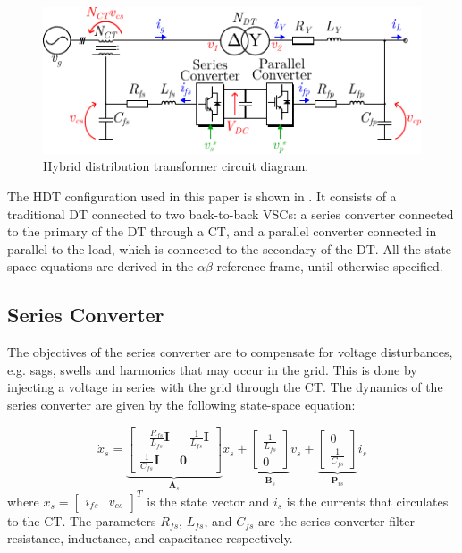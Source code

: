 \begin{figure}[t!]
    \centering
    \includegraphics[width=\columnwidth]{Images/HDT_Diagram.pdf} 
    \caption{Hybrid distribution transformer circuit diagram.}
    \label{fig:HDT_Transformer}
\end{figure}

The HDT configuration used in this paper is shown in . It consists of a traditional DT connected to two back-to-back VSCs: a series converter connected to the primary of the DT through a CT, and a parallel converter connected in parallel to the load, which is connected to the secondary of the DT. All the state-space equations are derived in the $\alpha\beta$ reference frame, until otherwise specified.

\subsection{Series Converter}
The objectives of the series converter are to compensate for voltage disturbances, e.g. sags, swells and harmonics that may occur in the grid. This is done by injecting a voltage in series with the grid through the CT. The dynamics of the series converter are given by the following state-space equation:

\begin{equation}
    \dot{x}_s =
    \underbrace{
    \begin{bmatrix}
        -\frac{R_{fs}}{L_{fs}} \mathbf{I} & -\frac{1}{L_{fs}} \mathbf{I} \\
        \frac{1}{C_{fs}} \mathbf{I} & \mathbf{0}
    \end{bmatrix}
    }_{\mathbf{A}_s}
    x_s +
    \underbrace{
    \begin{bmatrix}
        \frac{1}{L_{fs}}\\
        0
    \end{bmatrix}
    }_{\mathbf{B}_s}
    v_s +
    \underbrace{
    \begin{bmatrix}
        0 \\
        \frac{1}{C_{fs}}
    \end{bmatrix}
    }_{\mathbf{P}_{is}}
    i_s \label{eq:SeriesConverter_Dynamics}
\end{equation}
where $x_s = \begin{bmatrix} i_{fs} & v_{cs} \end{bmatrix}^T$ is the state vector and $i_s$ is the currents that circulates to the CT. The parameters $R_{fs}$, $L_{fs}$, and $C_{fs}$ are the series converter filter resistance, inductance, and capacitance respectively.


